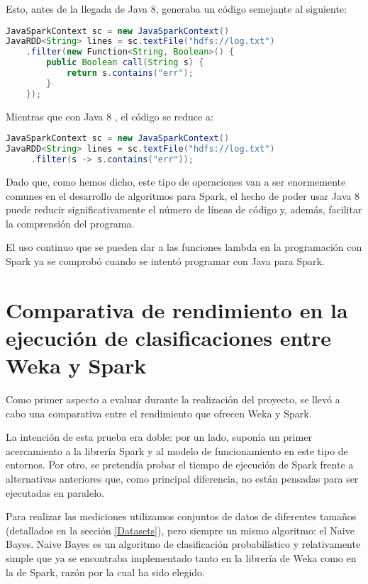 Esto, antes de la llegada de Java 8, generaba un código semejante al siguiente:

\begin{lstlisting}[language=Java,tabsize=4,frame = single,caption=Código de función lambda en Java 7 \cite{Java7vs8},captionpos=b,]
JavaSparkContext sc = new JavaSparkContext()
JavaRDD<String> lines = sc.textFile("hdfs://log.txt")
	.filter(new Function<String, Boolean>() {
		public Boolean call(String s) {
			return s.contains("err");
		}
	});
\end{lstlisting}

Mientras que con Java 8 , el código se reduce a:

\begin{lstlisting}[language=Java,tabsize=4,frame = single,caption=Código de función lambda en Java 8 \cite{Java7vs8},captionpos=b,]
JavaSparkContext sc = new JavaSparkContext()
JavaRDD<String> lines = sc.textFile("hdfs://log.txt")
     .filter(s -> s.contains("err"));
\end{lstlisting}

Dado que, como hemos dicho, este tipo de operaciones van a ser enormemente comunes en el desarrollo de algoritmos para Spark, el hecho de poder usar Java 8 puede reducir significativamente el número de líneas de código y, además, facilitar la comprensión del programa.

El uso continuo que se pueden dar a las funciones lambda en la programación con Spark ya se comprobó cuando se intentó programar con Java para Spark.


\section{Comparativa de rendimiento en la ejecución de clasificaciones entre Weka y Spark}

Como primer aspecto a evaluar durante la realización del proyecto, se llevó a cabo una comparativa entre el rendimiento que ofrecen Weka y Spark.

La intención de esta prueba era doble: por un lado, suponía un primer acercamiento a la librería Spark y al modelo de funcionamiento en este tipo de entornos. Por otro, se pretendía probar el tiempo de ejecución de Spark frente a alternativas anteriores que, como principal diferencia, no están pensadas para ser ejecutadas en paralelo.

Para realizar las mediciones utilizamos conjuntos de datos de diferentes tamaños (detallados en la sección \ref{Datasets}), pero siempre un mismo algoritmo: el Naive Bayes. Naive Bayes es un algoritmo de clasificación probabilístico y relativamente simple que ya se encontraba implementado tanto en la librería de Weka como en la de Spark, razón por la cual ha sido elegido.

